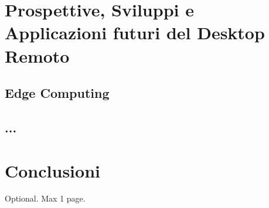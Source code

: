 \documentclass[12pt,a4paper,openright,twoside]{book}
\begin{document}
\chapter{Prospettive, Sviluppi e Applicazioni futuri del Desktop Remoto}

\section{Edge Computing}

\section{...}

\chapter{Conclusioni}
\label{chap:conclusions}


\backmatter

\nocite{*} %


    

\begin{acknowledgements} %
Optional. Max 1 page.
\end{acknowledgements}
\end{document}
